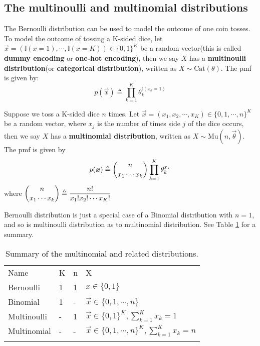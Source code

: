 \subsection{The multinoulli and multinomial distributions}

\begin{definition}
The Bernoulli distribution can be used to model the outcome of one coin tosses. To model the outcome of tossing a K-sided dice, let $\vec{x} =(\mathbb{I}(x=1),\cdots,\mathbb{I}(x=K)) \in \{0,1\}^K$ be a random vector(this is called \textbf{dummy encoding} or \textbf{one-hot encoding}), then we say $X$ has a \textbf{multinoulli distribution}(or \textbf{categorical distribution}), written as $X \sim \text{Cat}(\theta)$. The pmf is given by: 
\begin{equation}
p(\vec{x}) \triangleq \prod\limits_{k=1}^K\theta_k^{\mathbb{I}(x_k=1)}
\end{equation}
\end{definition}

\begin{definition}
Suppose we toss a K-sided dice $n$ times. Let $\vec{x} =(x_1,x_2,\cdots,x_K) \in \{0,1,\cdots,n\}^K$ be a random vector, where $x_j$ is the number of times side $j$ of the dice occurs, then we say $X$ has a \textbf{multinomial distribution}, written as $X \sim \text{Mu}(n, \vec{\theta})$. The pmf is given by 
\begin{equation}\label{eqn:multinomial-pmf}
p(\vec{x}) \triangleq \dbinom{n}{x_1 \cdots x_k} \prod\limits_{k=1}^K\theta_k^{x_k}
\end{equation}
where $\dbinom{n}{x_1 \cdots x_k} \triangleq \dfrac{n!}{x_1!x_2! \cdots x_K!}$
\end{definition}

Bernoulli distribution is just a special case of a Binomial distribution with $n=1$, and so is multinoulli distribution as to multinomial distribution. See Table \ref{tab:multinomial-summary} for a summary.

\begin{table}
\caption{Summary of the multinomial and related distributions.}
\label{tab:multinomial-summary}
\centering
\begin{tabular}{llll}
\hline\noalign{\smallskip}
Name & K & n & X \\
\noalign{\smallskip}\svhline\noalign{\smallskip}
Bernoulli & 1 & 1 & $x \in \{0,1\}$ \\
Binomial & 1 & - & $\vec{x} \in \{0,1,\cdots,n\}$ \\
Multinoulli & - & 1 & $\vec{x} \in \{0,1\}^K, \sum_{k=1}^K x_k=1$ \\
Multinomial & - & - & $\vec{x} \in \{0,1,\cdots,n\}^K, \sum_{k=1}^K x_k=n$ \\
\noalign{\smallskip}\hline
\end{tabular}
\end{table} 


